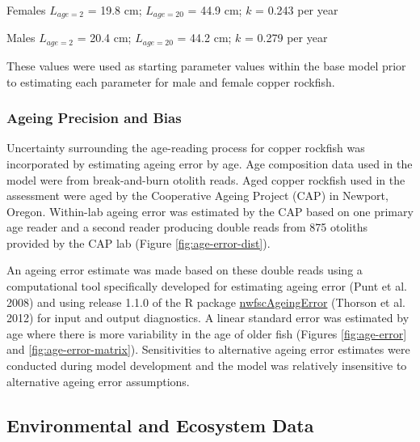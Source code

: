 \documentclass[11pt,
  english,
  letterpaper,
]{article}
\begin{document}
\begin{centering}

Females $L_{age=2}$ = 19.8 cm; $L_{age=20}$ = 44.9 cm; $k$ = 0.243 per year

Males $L_{age=2}$ = 20.4 cm; $L_{age=20}$ = 44.2 cm; $k$ = 0.279 per year

\end{centering}

\vspace{0.50cm}

These values were used as starting parameter values within the base model prior to estimating each parameter for male and female copper rockfish.

\hypertarget{ageing-precision-and-bias}{%
\subsubsection{Ageing Precision and Bias}\label{ageing-precision-and-bias}}

Uncertainty surrounding the age-reading process for copper rockfish was incorporated by estimating ageing error by age. Age composition data used in the model were from break-and-burn otolith reads. Aged copper rockfish used in the assessment were aged by the Cooperative Ageing Project (CAP) in Newport, Oregon. Within-lab ageing error was estimated by the CAP based on one primary age reader and a second reader producing double reads from 875 otoliths provided by the CAP lab (Figure \ref{fig:age-error-dist}).

An ageing error estimate was made based on these double reads using a computational tool specifically developed for estimating ageing error (Punt et al. 2008) and using release 1.1.0 of the R package \href{https://github.com/nwfsc-assess/nwfscAgeingError}{nwfscAgeingError} (Thorson et al. 2012) for input and output diagnostics. A linear standard error was estimated by age where there is more variability in the age of older fish (Figures \ref{fig:age-error} and \ref{fig:age-error-matrix}). Sensitivities to alternative ageing error estimates were conducted during model development and the model was relatively insensitive to alternative ageing error assumptions.

\hypertarget{environmental-and-ecosystem-data}{%
\subsection{Environmental and Ecosystem Data}\label{environmental-and-ecosystem-data}}
\end{document}
